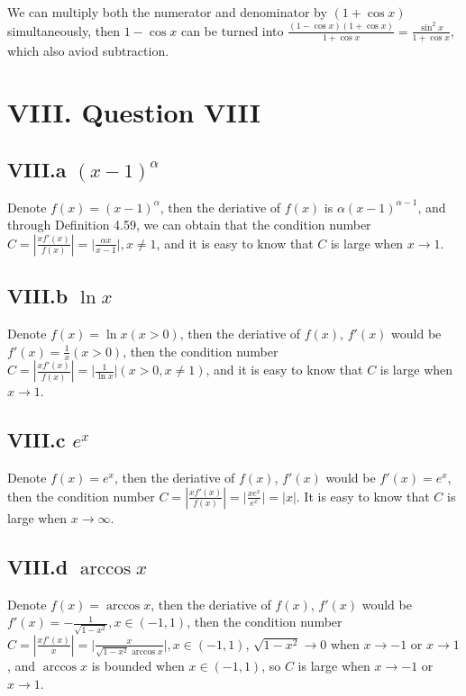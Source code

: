 \documentclass[a4paper]{article}
\begin{document}
We can multiply both the numerator and denominator by $(1+\cos x)$ simultaneously, then $1-\cos x$ can be turned into $\frac{(1-\cos x)(1+\cos x)}{1+\cos x}=\frac{\sin^2 x}{1+\cos x}$, which also aviod subtraction.

\section*{VIII. Question VIII}

\subsection*{VIII.a $(x-1)^{\alpha}$}

Denote $f(x)=(x-1)^{\alpha}$, then the deriative of $f(x)$ is $\alpha(x-1)^{\alpha-1}$, and through Definition 4.59, we can obtain that the condition number $C=|\frac{xf'(x)}{f(x)}|=\big|\frac{\alpha x}{x-1}\big|,x\neq 1$, and it is easy to know that
$C$ is large when $x\to 1$.

\subsection*{VIII.b $\ln x$}

Denote $f(x)=\ln x(x>0)$, then the deriative of $f(x)$, $f'(x)$ would be $f'(x)=\frac{1}{x}(x>0)$, then the condition number $C=|\frac{xf'(x)}{f(x)}|=\big|\frac{1}{\ln x}\big|(x>0,x\neq 1)$, and it is easy to know that $C$ is large when $x\to 1$.

\subsection*{VIII.c $e^{x}$}

Denote $f(x)=e^{x}$, then the deriative  of $f(x)$, $f'(x)$ would be $f'(x)=e^x$, then the condition number $C=|\frac{xf'(x)}{f(x)}|=\big|\frac{xe^x}{e^x}\big|=|x|$. It is easy to know that $C$ is large when $x\to \infty$.

\subsection*{VIII.d $\arccos x$}

Denote $f(x)=\arccos x$, then the deriative of $f(x)$, $f'(x)$ would be $f'(x)=-\frac{1}{\sqrt{1-x^2}},x\in(-1,1)$, then the condition number $C=|\frac{xf'(x)}{x}|=\big|\frac{x}{\sqrt{1-x^2}\arccos x}\big|,x\in(-1,1)$, $\sqrt{1-x^2}\to 0$ when $x\to -1$ or $x\to 1$, and $\arccos x$ is bounded when $x\in(-1,1)$, so $C$ 
is large when $x\to -1$ or $x\to 1$.
\end{document}
